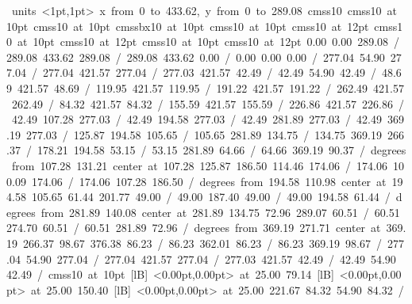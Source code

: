 \hbox{\beginpicture
\setcoordinatesystem units <1pt,1pt>
\setplotarea x from 0 to 433.62, y from 0 to 289.08
\setlinear
\font\picfont cmss10\picfont
\font\picfont cmss10 at 10pt\picfont
\font\picfont cmss10 at 10pt\picfont
\font\picfont cmssbx10 at 10pt\picfont
\font\picfont cmss10 at 10pt\picfont
\font\picfont cmss10 at 12pt\picfont
\font\picfont cmss10 at 10pt\picfont
\font\picfont cmss10 at 12pt\picfont
\font\picfont cmss10 at 10pt\picfont
\font\picfont cmss10 at 12pt\picfont
\setsolid
{} 0.00 0.00 289.08 /
 289.08 433.62 289.08 /
 289.08 433.62 0.00 /
 0.00 0.00 0.00 /
\setsolid
{} 277.04 54.90 277.04 /
 277.04 421.57 277.04 /
 277.03 421.57 42.49 /
 42.49 54.90 42.49 /
\setsolid
{} 48.69 421.57 48.69 /
\setsolid
{} 119.95 421.57 119.95 /
\setsolid
{} 191.22 421.57 191.22 /
\setsolid
{} 262.49 421.57 262.49 /
\setsolid
{} 84.32 421.57 84.32 /
\setsolid
{} 155.59 421.57 155.59 /
\setsolid
{} 226.86 421.57 226.86 /
\setsolid
{} 42.49 107.28 277.03 /
\setsolid
{} 42.49 194.58 277.03 /
\setsolid
{} 42.49 281.89 277.03 /
\setsolid
{} 42.49 369.19 277.03 /
\setsolid
{} 125.87 194.58 105.65 /
 105.65 281.89 134.75 /
 134.75 369.19 266.37 /
\setsolid
{} 178.21 194.58 53.15 /
 53.15 281.89 64.66 /
 64.66 369.19 90.37 /
 degrees from 107.28 131.21 center at 107.28 125.87
\setsolid
{} 186.50 114.46 174.06 /
 174.06 100.09 174.06 /
 174.06 107.28 186.50 /
 degrees from 194.58 110.98 center at 194.58 105.65
\setsolid
{} 61.44 201.77 49.00 /
 49.00 187.40 49.00 /
 49.00 194.58 61.44 /
 degrees from 281.89 140.08 center at 281.89 134.75
\setsolid
{} 72.96 289.07 60.51 /
 60.51 274.70 60.51 /
 60.51 281.89 72.96 /
 degrees from 369.19 271.71 center at 369.19 266.37
\setsolid
{} 98.67 376.38 86.23 /
 86.23 362.01 86.23 /
 86.23 369.19 98.67 /
\setsolid
{} 277.04 54.90 277.04 /
 277.04 421.57 277.04 /
 277.03 421.57 42.49 /
 42.49 54.90 42.49 /
\font\picfont cmss10 at 10pt\picfont
{}  [lB] <0.00pt,0.00pt> at 25.00 79.14
  [lB] <0.00pt,0.00pt> at 25.00 150.40
  [lB] <0.00pt,0.00pt> at 25.00 221.67
\setsolid
{} 84.32 54.90 84.32 /
\setsolid
}
